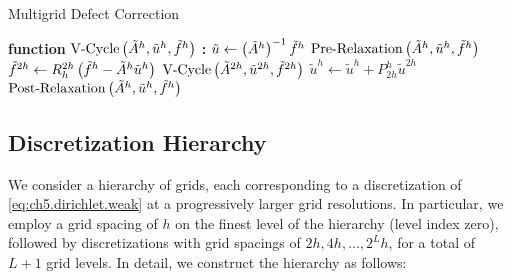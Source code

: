 \begin{algorithm}[htbp]
\caption{Multigrid Defect Correction}
\label{alg:ch5.multigrid}
\begin{algorithmic}[1]
\STATE \textbf{function} $\operatorname{V-Cycle} \left( \tilde{A}^h, \tilde{u}^h, \tilde{f}^h \right)$ \textbf{:}
    \STATE $\tilde{u} \leftarrow \left( \tilde{A}^h \right)^{-1} \tilde{f}^h$
    \RETURN
\ENDIF
\STATE $\operatorname{Pre-Relaxation} \left( \tilde{A}^h, \tilde{u}^h, \tilde{f}^h \right)$
\STATE $\tilde{f}^{2h} \leftarrow R_h^{2h} \left( \tilde{f}^h - \tilde{A}^h \tilde{u}^h \right)$ 
\STATE $\operatorname{V-Cycle} \left( \tilde{A}^{2h}, \tilde{u}^{2h}, \tilde{f}^{2h} \right)$
\STATE $\tilde{u}^h \leftarrow \tilde{u}^h + P_{2h}^h \tilde{u}^{2h}$ 
\STATE $\operatorname{Post-Relaxation} \left( \tilde{A}^h, \tilde{u}^h, \tilde{f}^h \right)$
\RETURN
\end{algorithmic}
\end{algorithm}

\subsection{Discretization Hierarchy}

We consider a hierarchy of grids, each corresponding to a discretization of \eqref{eq:ch5.dirichlet.weak} at a progressively larger grid resolutions. In particular, we employ a grid spacing of $h$ on the finest level of the hierarchy (level index zero), followed by discretizations with grid spacings of $2h, 4h, \dotsc, 2^Lh$, for a total of $L+1$ grid levels. In detail, we construct the hierarchy as follows:

